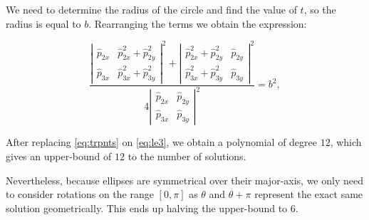 We need to determine the radius of the circle and find the value of $t$, so the radius is equal to $b$. Rearranging the terms we obtain the expression:

\begin{equation}\label{eq:le3}
\dfrac{\left|
	\begin{array}{cc}
	\hat{p}_{2x}& \hat{p}_{2x}^2+\hat{p}_{2y}^2\\
	\hat{p}_{3x}& \hat{p}_{3x}^2+\hat{p}_{3y}^2
	\end{array}\right|^2
+\left|
\begin{array}{cc}
\hat{p}_{2x}^2+\hat{p}_{2y}^2& \hat{p}_{2y}\\
\hat{p}_{3x}^2+\hat{p}_{3y}^2& \hat{p}_{3y}
\end{array}\right|^2
}{4\left|
\begin{array}{cc}
\hat{p}_{2x}& \hat{p}_{2y}\\
\hat{p}_{3x}& \hat{p}_{3y}
\end{array}\right|^2} = b^2,
\end{equation}

After replacing \autoref{eq:trpnts} on \autoref{eq:le3}, we obtain a polynomial of degree $12$, which gives an upper-bound of $12$ to the number of solutions.

Nevertheless, because ellipses are symmetrical over their major-axis, we only need to consider rotations on the range $[0, \pi]$ as $\theta$ and $\theta+\pi$ represent the exact same solution geometrically. This ends up halving the upper-bound to $6$.